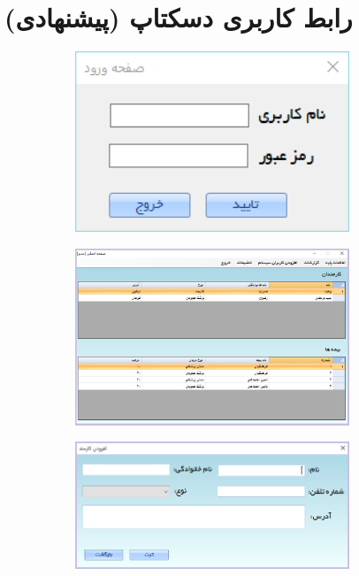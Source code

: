\documentclass[a4paper,12pt]{report}
\begin{document}
	\section{
		رابط کاربری دسکتاپ (پیشنهادی)
	}\label{sec2:chap3}
	
	\begin{figure}[!h]
		\centering
		\begin{subfigure}[t]{0.3\linewidth}
			\includegraphics[width=0.9\textwidth]{UI/Desktop_UI_1.png}
		\end{subfigure}
		\begin{subfigure}[t]{0.3\linewidth}
			\includegraphics[width=0.9\textwidth]{UI/Desktop_UI_2.PNG}
		\end{subfigure}
		\begin{subfigure}[t]{0.3\linewidth}
			\includegraphics[width=0.9\textwidth]{UI/Desktop_UI_3.PNG}

\end{subfigure}
\end{figure}
\end{document}

